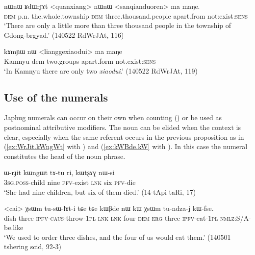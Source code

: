 \begin{exe}
\ex \label{ex:quanxiang}
\gll nɯnɯ ʁdɯrɟɤt <quanxiang> nɯnɯ <sanqianduoren> ma maŋe. \\
 \textsc{dem} p.n. the.whole.township \textsc{dem} three.thousand.people apart.from not:exist:\textsc{sens} \\
\glt  `There are only a little more than three thousand people in the township of Gdong-brgyad.' (140522 RdWrJAt, 116)
\end{exe}
 
\begin{exe}
\ex \label{ex:liangge}
\gll  kɤmɲɯ nɯ <lianggexiaodui> ma maŋe \\
 Kamnyu dem two.groups apart.form not.exist:\textsc{sens} \\
\glt `In Kamnyu there are only two \textit{xiaodui}.' (140522 RdWrJAt, 119)
\end{exe} 
 \subsection{Use of the numerals}  \label{sec:uses.numerals}
 Japhug numerals can occur on their own when counting () or be used as postnominal attributive modifiers. The noun can be elided when the context is clear, especially when the same referent occurs in the previous proposition as in (\ref{ex:WrJit.kWngWt}  with ) and (\ref{ex:kWBde.kW} with ). In this case the numeral constitutes the head of the noun phrase.

\begin{exe}
\ex \label{ex:WrJit.kWngWt} 
\gll
ɯ-rɟit kɯngɯt tɤ-tu ri, kɯtʂɤɣ nɯ-si \\
\textsc{3sg.poss}-child nine \textsc{pfv}-exist \textsc{lnk} six \textsc{pfv}-die \\
\glt `She had nine children, but six of them died.' (14-tApi taRi, 17)
\end{exe}

\begin{exe}
\ex \label{ex:kWBde.kW} 
\gll <cai> χsɯm tu-sɯ-lɤt-i tɕe tɕe  kɯβde nɯ kɯ χsɯm tu-ndza-j kɯ-fse. \\
dish three \textsc{ipfv}-\textsc{caus}-throw-\textsc{1pl} \textsc{lnk} \textsc{lnk} four \textsc{dem} \textsc{erg} three \textsc{ipfv}-eat-\textsc{1pl} \textsc{nmlz}:S/A-be.like \\
\glt `We used to order three dishes, and the four of us would eat them.' (140501 tshering scid, 92-3)
\end{exe}		

